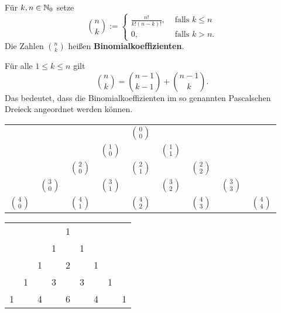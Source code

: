 \begin{definition}[Binomialkoeffizient]
	\label{def:I.1.12}
	Für $k,n \in \mathbb{N}_0$ setze
	\[
		\binom{n}{k} := \begin{cases}
			\frac{n!}{k!(n-k)!}, & \text{ falls } k \leq n \\
			0, & \text{ falls } k > n.
		\end{cases}
	\]
	Die Zahlen $\binom{n}{k}$ heißen \textbf{Binomialkoeffizienten}. 
\end{definition}

\begin{lemma}
	\label{lemma:I.1.13}
	Für alle $1 \leq k \leq n$ gilt
	\[
		\binom{n}{k} = \binom{n-1}{k-1} + \binom{n-1}{k}.
	\]
	Das bedeutet, dass die Binomialkoeffizienten im so genannten Pascalschen Dreieck angeordnet werden können. 
	
	\begin{center}
			\begin{tabular}{ccccccccc}
			               &                &                &                & $\binom{0}{0}$ &                &                &                &  \\
			               &                &                & $\binom{1}{0}$ &                & $\binom{1}{1}$ &                &                &  \\
			               &                & $\binom{2}{0}$ &                & $\binom{2}{1}$ &                & $\binom{2}{2}$ &                &  \\
			               & $\binom{3}{0}$ &                & $\binom{3}{1}$ &                & $\binom{3}{2}$ &                & $\binom{3}{3}$ &  \\
			$\binom{4}{0}$ &                & $\binom{4}{1}$ &                & $\binom{4}{2}$ &                & $\binom{4}{3}$ &                & $\binom{4}{4}$
		\end{tabular} \hspace{1cm}
		\begin{tabular}{ccccccccc}
			  &   &   &   & 1 &   &   &   &  \\
			  &   &   & 1 &   & 1 &   &   &  \\
			  &   & 1 &   & 2 &   & 1 &   &  \\
			  & 1 &   & 3 &   & 3 &   & 1 &  \\
			1 &   & 4 &   & 6 &   & 4 &   & 1
		\end{tabular} 
	\end{center}
	
\end{lemma}

